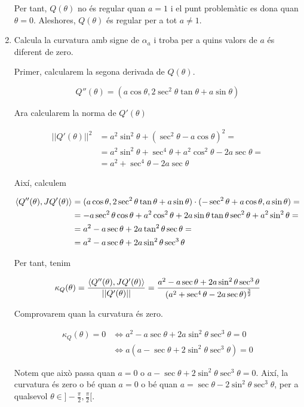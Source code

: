 \documentclass[a4paper, 11pt]{article}
\begin{document}
\begin{solution}
\begin{enumerate}[label=(\alph*)]
      Per tant, $Q(\theta)$ no és regular quan $a=1$ i el punt problemàtic es dona quan $\theta=0$.
      Aleshores, $Q(\theta)$ és regular per a tot $a\neq 1$.
    
    
      \item Calcula la curvatura amb signe de $\alpha_a$ i troba per a quins valors de $a$ és diferent de zero.
      
      Primer, calcularem la segona derivada de $Q(\theta)$.
  
      $$Q''(\theta) = (a\cos \theta, 2\sec^2\theta \tan\theta + a\sin\theta)$$
  
      Ara calcularem la norma de $Q'(\theta)$
  
      \begin{align*}
        ||Q'(\theta)||^2 &=a^2\sin^2\theta + (\sec^2\theta- a\cos\theta)^2 =\\
        &= a^2\sin^2\theta + \sec^4\theta + a^2\cos^2\theta - 2a\sec\theta = \\
        &=a^2 + \sec^4 \theta -2a\sec\theta
      \end{align*}
  
      Així, calculem
  
      \begin{align*}
        \left\langle Q''(\theta), JQ'(\theta)\right\rangle &= (a\cos \theta, 2\sec^2\theta \tan\theta + a\sin\theta) \cdot ( -\sec^2 \theta + a\cos \theta, a\sin \theta) =\\
        &= -a\sec^2\theta \cos \theta + a^2 \cos^2\theta + 2a\sin\theta \tan\theta \sec^2\theta + a^2\sin^2\theta = \\
        &= a^2 -a\sec\theta + 2a\tan^2\theta \sec\theta = \\
        &= a^2 -a\sec\theta + 2a \sin^2\theta \sec^3\theta
      \end{align*}
  
      Per tant, tenim
  
      $$\kappa_Q (\theta) = \frac{\left\langle Q''(\theta), JQ'(\theta)\right\rangle}{||Q'(\theta)||} 
      = \frac{a^2 -a\sec\theta + 2a \sin^2\theta \sec^3\theta}{(a^2 + \sec^4 \theta -2a\sec\theta)^{\frac{3}{2}}}$$
  
  
      Comprovarem quan la curvatura és zero.
  
      \begin{align*}
        \kappa_Q (\theta) = 0 &\iff a^2 -a\sec\theta + 2a \sin^2\theta \sec^3\theta = 0\\
        & \iff a(a-\sec\theta +2\sin^2\theta \sec^3\theta)=0
      \end{align*}
  
      Notem que això passa quan $a=0$ o $a-\sec\theta +2\sin^2\theta \sec^3\theta=0$.
      Així, la curvatura és zero o bé quan $a=0$ o bé quan $a = \sec\theta - 2\sin^2\theta \sec^3\theta$,
      per a qualsevol $\theta \in ]-\frac{\pi}{2},\frac{\pi}{2}[$.
    \end{enumerate}    
  \end{solution}
\end{document}
